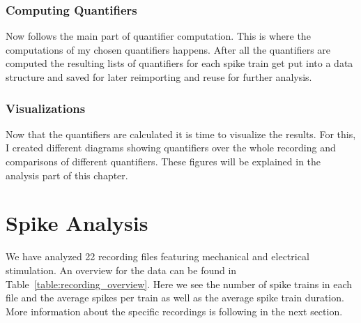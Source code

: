 \subsubsection{Computing Quantifiers}
Now follows the main part of quantifier computation. This is where the computations of my chosen quantifiers happens. After all the quantifiers are computed the resulting lists of quantifiers for each spike train get put into a data structure and saved for later reimporting and reuse for further analysis.\\
\subsubsection{Visualizations}
Now that the quantifiers are calculated it is time to visualize the results. For this, I created different diagrams showing quantifiers over the whole recording and comparisons of different quantifiers. These figures will be explained in the analysis part of this chapter.\\



\section{Spike Analysis}
We have analyzed 22 recording files featuring  mechanical and electrical stimulation. An overview for the data can be found in  Table~\ref{table:recording_overview}. Here we see the number of spike trains in each file and the average spikes per train as well as the average spike train duration. More information about the specific recordings is following in the next section.

